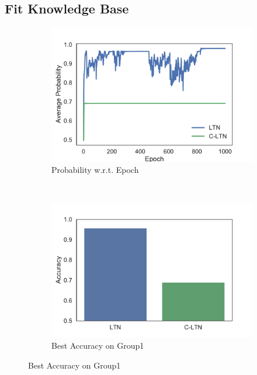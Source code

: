
\subsection{Fit Knowledge Base}

\begin{figure}[!]
    \centering
    \begin{subfigure}[]{0.33\textwidth}
        \includegraphics[width=\textwidth]{img/curve1.pdf}
        \caption{Probability w.r.t. Epoch}
        \label{fig:fitting-prob-epoch}
    \end{subfigure}~~~~
    \begin{subfigure}[]{0.33\textwidth}
        \includegraphics[width=\textwidth]{img/bar1.pdf}
        \caption{Best Accuracy on Group1}

\end{subfigure}
\end{figure}
